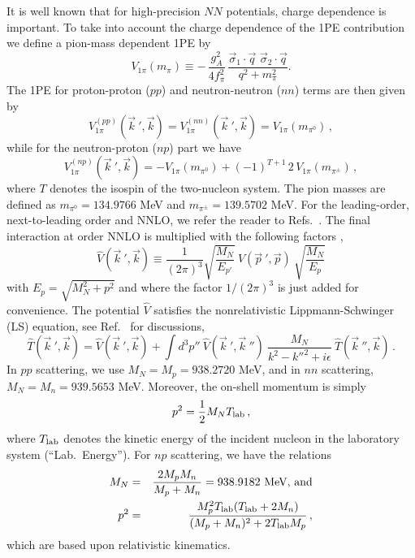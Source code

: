 It is well known that for high-precision $NN$ potentials, charge
dependence is important.  To take into account the charge
dependence of the 1PE contribution we define a pion-mass dependent
1PE by
\[
V_{1\pi} (m_\pi) \equiv - \,
\frac{g_A^2}{4f_\pi^2} \, \frac{ \vec \sigma_1 \cdot \vec q \,\, \vec
  \sigma_2 \cdot \vec q} {q^2 + m_\pi^2}.
\]
The 1PE for proton-proton ($pp$) and neutron-neutron ($nn$) terms
are then given by
\[
V_{1\pi}^{(pp)} ({\vec k}~', \vec k) = V_{1\pi}^{(nn)} ({\vec k}~',
\vec k) = V_{1\pi} (m_{\pi^0}) \,,
\]
while for the neutron-proton ($np$) part  we have
\[
V_{1\pi}^{(np)} ({\vec k}~', \vec k) = -V_{1\pi} (m_{\pi^0}) +
(-1)^{T+1}\, 2\, V_{1\pi} (m_{\pi^\pm}) \,,
\]
where $T$ denotes the isospin of the two-nucleon system.  The pion masses are defined  as
$m_{\pi^0}=134.9766$ MeV and $m_{\pi^\pm}=139.5702$ MeV.  For the
leading-order, next-to-leading order and NNLO, we refer the reader to
Refs.~\cite{machleidt2011,ekstromPRX}.  The final interaction at
order NNLO is multiplied with the following factors
\cite{machleidt2011},
\begin{equation}
\widehat{V}({\vec k}~',{\vec k}) \equiv \frac{1}{(2\pi)^3}
\sqrt{\frac{M_N}{E_{p'}}}\: {V}({\vec p}~',{\vec p})\:
\sqrt{\frac{M_N}{E_{p}}}
\label{eq_minrel1}
\end{equation}
with $E_p=\sqrt{M_N^2+p^2}$ and where the factor $1/(2\pi)^3$ is just
added for convenience.  The potential $\widehat{V}$ satisfies the
nonrelativistic Lippmann-Schwinger (LS) equation, see Ref.~\cite{machleidt2011} for discussions,
\begin{equation}
 \widehat{T}({\vec k}~',{\vec k})= \widehat{V}({\vec k}~',{\vec k})+
 \int d^3p''\: \widehat{V}({\vec k}~',{\vec k}~'')\: \frac{M_N} {{
     k}^{2}-{k''}^{2}+i\epsilon}\: \widehat{T}({\vec k}~'',{\vec k})
 \, .
\label{eq_LS}
\end{equation}
In $pp$ scattering, we use $M_N=M_p=938.2720$ MeV, and in $nn$
scattering, $M_N=M_n=939.5653$ MeV.  Moreover, the on-shell momentum
is simply
\begin{equation}
p^2 = \frac12 M_N T_{\rm lab} \,,
\end{equation}
where $T_{\rm lab}$ denotes the kinetic energy of the incident nucleon
in the laboratory system (``Lab.\ Energy'').  For $np$ scattering, we
have the relations
\begin{eqnarray}
M_N &=& \frac{2M_pM_n}{M_p+M_n} = 938.9182 \mbox{ MeV, and} \\ p^2 & =
& \frac{M_p^2 T_{\rm lab} (T_{\rm lab} + 2M_n)} {(M_p + M_n)^2 +
  2T_{\rm lab} M_p} \,,
\end{eqnarray}
which are based upon relativistic kinematics.

